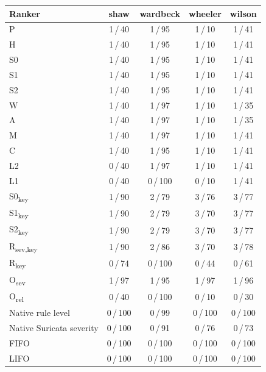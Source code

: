\begin{tabular}{lcccc}
\toprule
Ranker & shaw & wardbeck & wheeler & wilson \\
\midrule
P & 1\,/\,40 & 1\,/\,95 & 1\,/\,10 & 1\,/\,41 \\
H & 1\,/\,40 & 1\,/\,95 & 1\,/\,10 & 1\,/\,41 \\
S0 & 1\,/\,40 & 1\,/\,95 & 1\,/\,10 & 1\,/\,41 \\
S1 & 1\,/\,40 & 1\,/\,95 & 1\,/\,10 & 1\,/\,41 \\
S2 & 1\,/\,40 & 1\,/\,95 & 1\,/\,10 & 1\,/\,41 \\
W & 1\,/\,40 & 1\,/\,97 & 1\,/\,10 & 1\,/\,35 \\
A & 1\,/\,40 & 1\,/\,97 & 1\,/\,10 & 1\,/\,35 \\
M & 1\,/\,40 & 1\,/\,97 & 1\,/\,10 & 1\,/\,41 \\
C & 1\,/\,40 & 1\,/\,95 & 1\,/\,10 & 1\,/\,41 \\
L2 & 0\,/\,40 & 1\,/\,97 & 1\,/\,10 & 1\,/\,41 \\
L1 & 0\,/\,40 & 0\,/\,100 & 0\,/\,10 & 1\,/\,41 \\
S0\textsubscript{key} & 1\,/\,90 & 2\,/\,79 & 3\,/\,76 & 3\,/\,77 \\
S1\textsubscript{key} & 1\,/\,90 & 2\,/\,79 & 3\,/\,70 & 3\,/\,77 \\
S2\textsubscript{key} & 1\,/\,90 & 2\,/\,79 & 3\,/\,70 & 3\,/\,77 \\
R\textsubscript{sev,key} & 1\,/\,90 & 2\,/\,86 & 3\,/\,70 & 3\,/\,78 \\
R\textsubscript{key} & 0\,/\,74 & 0\,/\,100 & 0\,/\,44 & 0\,/\,61 \\
O\textsubscript{sev} & 1\,/\,97 & 1\,/\,95 & 1\,/\,97 & 1\,/\,96 \\
O\textsubscript{rel} & 0\,/\,40 & 0\,/\,100 & 0\,/\,10 & 0\,/\,30 \\
Native rule level & 0\,/\,100 & 0\,/\,99 & 0\,/\,100 & 0\,/\,100 \\
Native Suricata severity & 0\,/\,100 & 0\,/\,91 & 0\,/\,76 & 0\,/\,73 \\
FIFO & 0\,/\,100 & 0\,/\,100 & 0\,/\,100 & 0\,/\,100 \\
LIFO & 0\,/\,100 & 0\,/\,100 & 0\,/\,100 & 0\,/\,100 \\
\bottomrule
\end{tabular}
